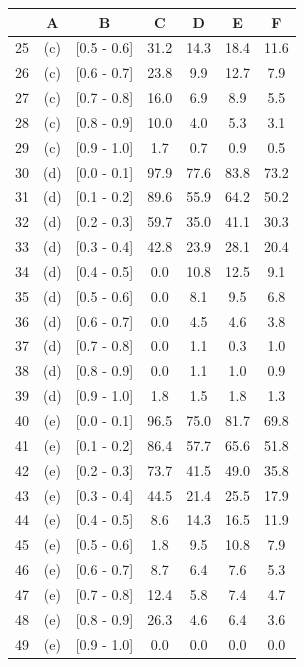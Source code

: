 \begin{table}[htbp]
\begin{tabular}{|c|c|c|c|c|c|c|}
\hline
\end{tabular}
\begin{tabular}{|c|c|c|c|c|c|c|}
\hline
{} &    A &            B &    C &    D &    E &    F \\
\hline
25 &  (c) &  [0.5 - 0.6] & 31.2 & 14.3 & 18.4 & 11.6 \\
26 &  (c) &  [0.6 - 0.7] & 23.8 &  9.9 & 12.7 &  7.9 \\
27 &  (c) &  [0.7 - 0.8] & 16.0 &  6.9 &  8.9 &  5.5 \\
28 &  (c) &  [0.8 - 0.9] & 10.0 &  4.0 &  5.3 &  3.1 \\
29 &  (c) &  [0.9 - 1.0] &  1.7 &  0.7 &  0.9 &  0.5 \\
30 &  (d) &  [0.0 - 0.1] & 97.9 & 77.6 & 83.8 & 73.2 \\
31 &  (d) &  [0.1 - 0.2] & 89.6 & 55.9 & 64.2 & 50.2 \\
32 &  (d) &  [0.2 - 0.3] & 59.7 & 35.0 & 41.1 & 30.3 \\
33 &  (d) &  [0.3 - 0.4] & 42.8 & 23.9 & 28.1 & 20.4 \\
34 &  (d) &  [0.4 - 0.5] &  0.0 & 10.8 & 12.5 &  9.1 \\
35 &  (d) &  [0.5 - 0.6] &  0.0 &  8.1 &  9.5 &  6.8 \\
36 &  (d) &  [0.6 - 0.7] &  0.0 &  4.5 &  4.6 &  3.8 \\
37 &  (d) &  [0.7 - 0.8] &  0.0 &  1.1 &  0.3 &  1.0 \\
38 &  (d) &  [0.8 - 0.9] &  0.0 &  1.1 &  1.0 &  0.9 \\
39 &  (d) &  [0.9 - 1.0] &  1.8 &  1.5 &  1.8 &  1.3 \\
40 &  (e) &  [0.0 - 0.1] & 96.5 & 75.0 & 81.7 & 69.8 \\
41 &  (e) &  [0.1 - 0.2] & 86.4 & 57.7 & 65.6 & 51.8 \\
42 &  (e) &  [0.2 - 0.3] & 73.7 & 41.5 & 49.0 & 35.8 \\
43 &  (e) &  [0.3 - 0.4] & 44.5 & 21.4 & 25.5 & 17.9 \\
44 &  (e) &  [0.4 - 0.5] &  8.6 & 14.3 & 16.5 & 11.9 \\
45 &  (e) &  [0.5 - 0.6] &  1.8 &  9.5 & 10.8 &  7.9 \\
46 &  (e) &  [0.6 - 0.7] &  8.7 &  6.4 &  7.6 &  5.3 \\
47 &  (e) &  [0.7 - 0.8] & 12.4 &  5.8 &  7.4 &  4.7 \\
48 &  (e) &  [0.8 - 0.9] & 26.3 &  4.6 &  6.4 &  3.6 \\
49 &  (e) &  [0.9 - 1.0] &  0.0 &  0.0 &  0.0 &  0.0 \\
\hline
\end{tabular}
\end{table}

\pagebreak